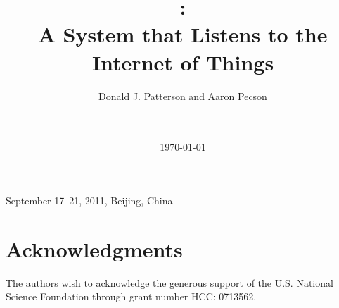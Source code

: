 \documentclass{chi2008}
\title{\Cacophony:\\ A System that Listens to the Internet of Things}
\author{
\alignauthor
Donald J. Patterson and Aaron Pecson\\
       \affaddr{Department of Informatics}\\
       \affaddr{University of California, Irvine, USA}\\
       \email{ \{djp3,apecson\}@uci.edu}
}
\begin{document}
 {September 17--21, 2011, Beijing, China} 





\date{\today}

\maketitle







\section{Acknowledgments}
The authors wish to acknowledge the generous support of the U.S. National
Science Foundation through grant number HCC: 0713562.



\balancecolumns
\end{document}
